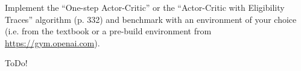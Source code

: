 
\begin{exercise}

Implement the \enquote{One-step Actor-Critic} or the \enquote{Actor-Critic with Eligibility Traces} algorithm (p. 332) and benchmark with an environment of your choice (i.e. from the textbook or a pre-build environment from \href{https://gym.openai.com}{https://gym.openai.com}).

\end{exercise}


\begin{solution}

ToDo!

\end{solution}

